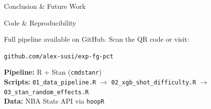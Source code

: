 \documentclass[final]{beamer}
\newlength{\onecolwid}
\begin{document}
\begin{frame}[t]
\begin{columns}[t]
\begin{column}{\onecolwid}
\begin{block}{Conclusion \& Future Work}
\end{block}



\begin{alertblock}{Code \& Reproducibility}

Full pipeline available on GitHub. Scan the QR code or visit:

\vspace{0.5ex}

\begin{center}

\vspace{0.3ex}
{\small \texttt{github.com/alex-susi/exp-fg-pct}}
\end{center}

\vspace{0.5ex}

{\small
\textbf{Pipeline:} R + Stan (\texttt{cmdstanr}) \\
\textbf{Scripts:} \texttt{01\_data\_pipeline.R} $\to$ \texttt{02\_xgb\_shot\_difficulty.R} $\to$ \texttt{03\_stan\_random\_effects.R} \\
\textbf{Data:} NBA Stats API via \texttt{hoopR}
}

\end{alertblock}


% 
% 


\end{column}

\end{columns}

\end{frame}
\end{document}
